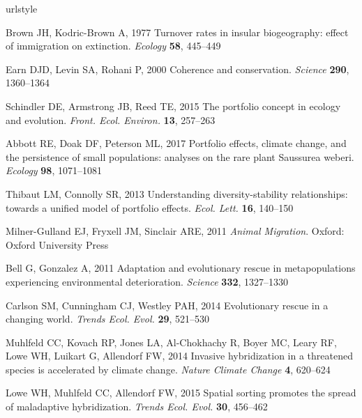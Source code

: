 \documentclass{revtex4}
\begin{document}
% 
% 
\begin{thebibliography}{10}
\expandafter\ifx\csname urlstyle\endcsname\relax
  \providecommand{\doi}[1]{doi:\discretionary{}{}{}#1}\else
  \providecommand{\doi}{doi:\discretionary{}{}{}\begingroup
  \urlstyle{rm}\Url}\fi

Brown JH, Kodric-Brown A, 1977 {Turnover rates in insular biogeography: effect
  of immigration on extinction}.
\newblock \emph{Ecology} \textbf{58}, 445--449

Earn DJD, Levin SA, Rohani P, 2000 {Coherence and conservation}.
\newblock \emph{Science} \textbf{290}, 1360--1364

Schindler DE, Armstrong JB, Reed TE, 2015 {The portfolio concept in ecology and
  evolution}.
\newblock \emph{Front. Ecol. Environ.} \textbf{13}, 257--263

Abbott RE, Doak DF, Peterson ML, 2017 {Portfolio effects, climate change, and
  the persistence of small populations: analyses on the rare plant Saussurea
  weberi.}
\newblock \emph{Ecology} \textbf{98}, 1071--1081

Thibaut LM, Connolly SR, 2013 {Understanding diversity-stability relationships:
  towards a unified model of portfolio effects.}
\newblock \emph{Ecol. Lett.} \textbf{16}, 140--150

Milner-Gulland EJ, Fryxell JM, Sinclair ARE, 2011 \emph{{Animal Migration}}.
\newblock Oxford: Oxford University Press

Bell G, Gonzalez A, 2011 {Adaptation and evolutionary rescue in metapopulations
  experiencing environmental deterioration}.
\newblock \emph{Science} \textbf{332}, 1327--1330

Carlson SM, Cunningham CJ, Westley PAH, 2014 {Evolutionary rescue in a changing
  world}.
\newblock \emph{Trends Ecol. Evol.} \textbf{29}, 521--530

Muhlfeld CC, Kovach RP, Jones LA, Al-Chokhachy R, Boyer MC, Leary RF, Lowe WH,
  Luikart G, Allendorf FW, 2014 {Invasive hybridization in a threatened species
  is accelerated by climate change}.
\newblock \emph{Nature Climate Change} \textbf{4}, 620--624

Lowe WH, Muhlfeld CC, Allendorf FW, 2015 {Spatial sorting promotes the spread
  of maladaptive hybridization}.
\newblock \emph{Trends Ecol. Evol.} \textbf{30}, 456--462


\end{thebibliography}
\end{document}
